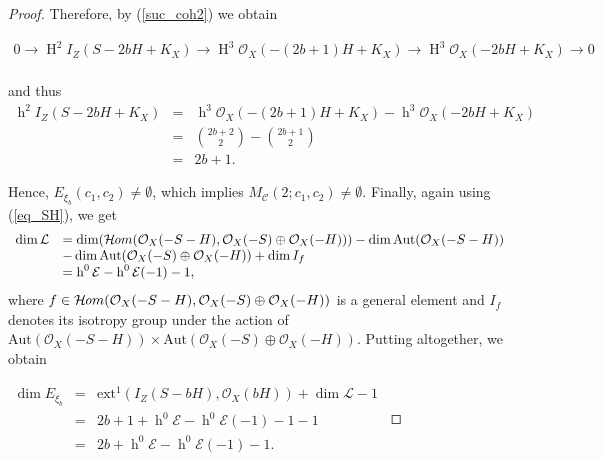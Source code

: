\documentclass[10pt,a4paper]{amsart}
\newcommand {\Aut}{\mathrm{Aut}}
\newcommand {\Hom}{\mathcal{H}\kern -0.25ex{\mathit om}}
\newcommand {\ext}{\mathrm{ext}}
\newcommand{\Ho}{\operatorname{H}}
\newcommand{\h}{\operatorname{h}}
\begin{document}
\begin{proof}
Therefore, by (\ref{suc_coh2}) we obtain 

$\begin{array}{l}
\label{suc_coh}
0 \rightarrow \Ho^2I_Z(S-2bH+K_X) 
\rightarrow \Ho^{3}\mathcal{O}_X(-(2b+1)H+K_X) \rightarrow \Ho^{3}\mathcal{O}_X(-2bH+K_X) \rightarrow 0\\
\end{array}$

and thus 
\[
\begin{array}{rcl}
\h^2I_Z(S-2bH+K_X) &=& \h^{3}\mathcal{O}_X(-(2b+1)H+K_X) - \h^{3}\mathcal{O}_X(-2bH+K_X) \\
&=& \binom{2b+2}{2} - \binom{2b+1}{2} \\
&=& 2b+1.
\end{array}
\]


Hence,   $E_{\xi_b}(c_1,c_2)\neq\emptyset$, which implies   $M_{\mathcal{C}}(2;c_1,c_2)\neq\emptyset$.
Finally, again using (\ref{eq_SH}), %
we get 
\[
\begin{array}{lll}
\dim\mathcal{L} &= \dim(\Hom(\mathcal{O}_X(-S-H),\mathcal{O}_X(-S)\oplus\mathcal{O}_X(-H)))-\dim\Aut(\mathcal{O}_X(-S-H))\\
&-\dim\Aut(\mathcal{O}_X(-S)\oplus \mathcal{O}_X(-H))+\dim I_f \\
&=  \h^0\mathcal{E}-\h^0\mathcal{E}(-1)-1,
\end{array}
\]
where $f\in\Hom(\mathcal{O}_X(-S-H),\mathcal{O}_X(-S)\oplus\mathcal{O}_X(-H))$ is a general element and $I_f$ denotes its isotropy group under the action of $\Aut(\mathcal{O}_X(-S-H))\times\Aut(\mathcal{O}_X(-S)\oplus\mathcal{O}_X(-H))$. Putting altogether, we obtain

$\begin{array}{rrl}
 \dim E_{\xi_b}&=&\ext^1 (I_Z(S-bH),\mathcal{O}_X(bH))+\dim\mathcal{L}-1    \\ &=&2b+1+\h^0\mathcal{E}-\h^0\mathcal{E}(-1)-1-1\\ 
     & =& 2b+\h^0\mathcal{E}-\h^0\mathcal{E}(-1)-1.
\end{array}$
 \end{proof}
\end{document}

